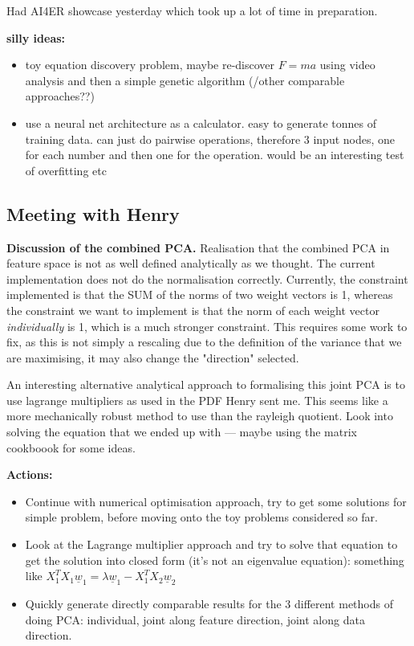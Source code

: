 \documentclass[11pt,a4paper]{article}
\begin{document}
Had AI4ER showcase yesterday which took up a lot of time in preparation.

\textbf{silly ideas:}
\begin{itemize}
  \item toy equation discovery problem, maybe re-discover $F = ma$ using video analysis and then a simple genetic algorithm (/other comparable approaches??)
  \item use a neural net architecture as a calculator. easy to generate tonnes of training data. can just do pairwise operations, therefore 3 input nodes, one for each number and then one for the operation. would be an interesting test of overfitting etc
\end{itemize}

\subsection{Meeting with Henry}

\textbf{Discussion of the combined PCA.} 
Realisation that the combined PCA in feature space is not as well defined analytically as we thought.
The current implementation does not do the normalisation correctly.
Currently, the constraint implemented is that the SUM of the norms of two weight vectors is 1, whereas the constraint we want to implement is that the norm of each weight vector \textit{individually} is 1, which is a much stronger constraint.
This requires some work to fix, as this is not simply a rescaling due to the definition of the variance that we are maximising, it may also change the "direction" selected.

An interesting alternative analytical approach to formalising this joint PCA is to use lagrange multipliers as used in the PDF Henry sent me.
This seems like a more mechanically robust method to use than the rayleigh quotient.
Look into solving the equation that we ended up with --- maybe using the matrix cookboook for some ideas.

\textbf{Actions:}
\begin{itemize}
  \item Continue with numerical optimisation approach, try to get some solutions for simple problem, before moving onto the toy problems considered so far.
  \item Look at the Lagrange multiplier approach and try to solve that equation to get the solution into closed form (it's not an eigenvalue equation): something like $X_{1}^{T}X_{1}\underline{w}_{1} = \lambda \underline{w}_{1} - X_{1}^{T}X_{2} \underline{w}_{2}$
  \item Quickly generate directly comparable results for the 3 different methods of doing PCA: individual, joint along feature direction, joint along data direction.

\end{itemize}
\end{document}
